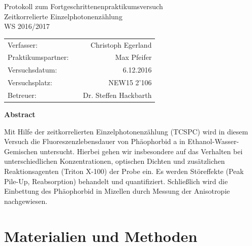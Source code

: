 \documentclass{article}
\begin{document}
\begin{titlepage}
\centering
Protokoll zum Fortgeschrittenenpraktikumsversuch\\[2cm]\Huge
\vfill
\Huge
Zeitkorrelierte Einzelphotonenzählung\\[2cm]\Large
WS 2016/2017 \\
\vfill
\normalsize
\begin{tabular}{lcr}
Verfasser: &   & Christoph Egerland \\
Praktikumspartner: &   & Max Pfeifer\\
Versuchsdatum: &   &  6.12.2016 \\
Versuchsplatz: &   & NEW15 2'106\\
Betreuer: &   & Dr. Steffen Hackbarth\\
\end{tabular}
\end{titlepage}

\begin{center}
  \textbf{Abstract}
\end{center}
Mit Hilfe der zeitkorrelierten Einzelphotonenzählung (TCSPC) wird in diesem Versuch die Fluoreszenzlebensdauer von Phäophorbid a in Ethanol-Wasser-Gemischen untersucht.
Hierbei gehen wir insbesondere auf das Verhalten bei unterschiedlichen Konzentrationen, optischen Dichten und
zusätzlichen Reaktionsagenten (Triton X-100) der Probe ein. Es werden Störeffekte (Peak Pile-Up, Reabsorption) behandelt und quantifiziert.
Schließlich wird die Einbettung des Phäophorbid in Mizellen durch Messung der Anisotropie nachgewiesen.

\tableofcontents
\newpage


\section{Materialien und Methoden}
\end{document}
